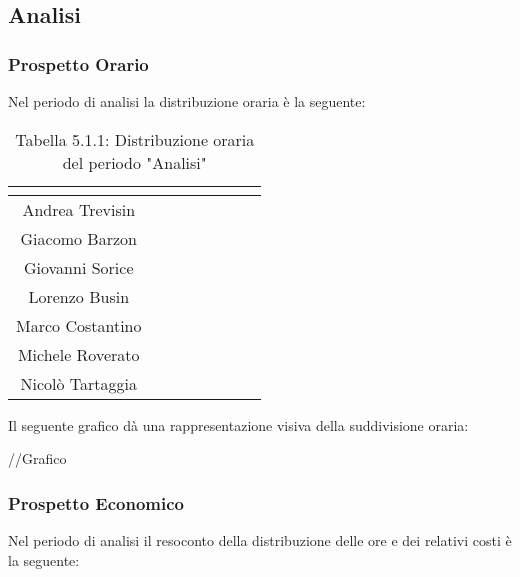 \subsection{Analisi}

\subsubsection{Prospetto Orario}
Nel periodo di analisi la distribuzione oraria è la seguente:

\renewcommand{\arraystretch}{1.5}
\begin{table}[H]
\begin{center}
\begin{tabular}{|c|c|c|c|c|c|c|c|}
\hline
\rowcolor{title_row}
\textbf{\color{title_text}{Nome}} & \textbf{\color{title_text}{Resp.}} & \textbf{\color{title_text}{Ammi.}} & \textbf{\color{title_text}{Analist.}} & \textbf{\color{title_text}{Progett.}} & \textbf{\color{title_text}{Program.}} & \textbf{\color{title_text}{Verific.}} & \textbf{\color{title_text}{Totale}} \\ \hline
Andrea Trevisin  & & & & & & &  \\ \hline
Giacomo Barzon   & & & & & & &  \\ \hline
Giovanni Sorice  & & & & & & &  \\ \hline
Lorenzo Busin    & & & & & & &  \\ \hline
Marco Costantino & & & & & & &  \\ \hline
Michele Roverato & & & & & & &  \\ \hline
Nicolò Tartaggia & & & & & & &  \\ \hline
\end{tabular}
\caption{Tabella 5.1.1: Distribuzione oraria del periodo "Analisi"\label{}}
\end{center}
\end{table}
\renewcommand{\arraystretch}{1}

Il seguente grafico dà una rappresentazione visiva della suddivisione oraria: \\
\begin{center}
//Grafico
\end{center}


\subsubsection{Prospetto Economico}
Nel periodo di analisi il resoconto della distribuzione delle ore e dei relativi costi è la seguente:

